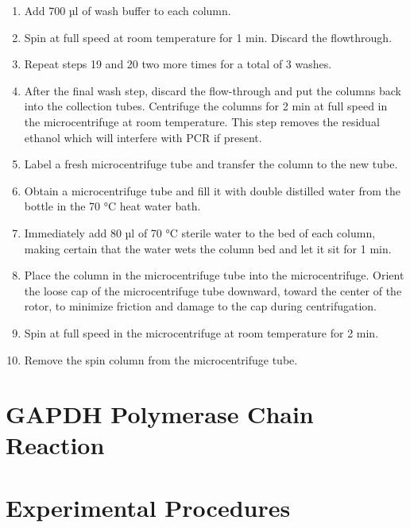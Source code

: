 \documentclass[]{book}
\providecommand{\tightlist}{%
  \setlength{\itemsep}{0pt}\setlength{\parskip}{0pt}}
\begin{document}
\begin{enumerate}
\def\labelenumi{\arabic{enumi}.}
\setcounter{enumi}{18}
\tightlist
\item
  Add 700 µl of wash buffer to each column.
\item
  Spin at full speed at room temperature for 1 min. Discard the
  flowthrough.
\item
  Repeat steps 19 and 20 two more times for a total of 3 washes.
\item
  After the final wash step, discard the flow-through and put the
  columns back into the collection tubes. Centrifuge the columns for 2
  min at full speed in the microcentrifuge at room temperature. This
  step removes the residual ethanol which will interfere with PCR if
  present.
\item
  Label a fresh microcentrifuge tube and transfer the column to the new
  tube.
\item
  Obtain a microcentrifuge tube and fill it with double distilled water
  from the bottle in the 70 °C heat water bath.
\item
  Immediately add 80 µl of 70 °C sterile water to the bed of each
  column, making certain that the water wets the column bed and let it
  sit for 1 min.
\item
  Place the column in the microcentrifuge tube into the microcentrifuge.
  Orient the loose cap of the microcentrifuge tube downward, toward the
  center of the rotor, to minimize friction and damage to the cap during
  centrifugation.
\item
  Spin at full speed in the microcentrifuge at room temperature for 2
  min.
\item
  Remove the spin column from the microcentrifuge tube.
\end{enumerate}

\section{GAPDH Polymerase Chain
Reaction}\label{gapdh-polymerase-chain-reaction}

\section{Experimental Procedures}\label{experimental-procedures-9}
\end{document}
